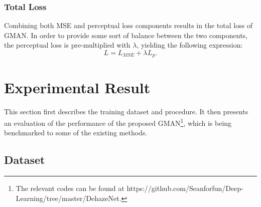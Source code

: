 \documentclass[journal]{IEEEtran}
\begin{document}



\subsubsection{Total Loss}
Combining both MSE and perceptual loss components results in the total loss of GMAN. In order to provide some sort of balance between the two components, the perceptual loss is pre-multiplied with $\lambda$, yielding the following expression:
\begin{equation}\label{loss}
L=L_{MSE}+\lambda_{}L_{p}.
\end{equation}


\section{Experimental Result}

This section first describes the training dataset and procedure. It then presents an evaluation of the performance of the proposed GMAN\footnote{The relevant codes can be found at https://github.com/Seanforfun/Deep-Learning/tree/master/DehazeNet.}, which is being benchmarked to some of the existing methods.

\subsection{Dataset}
\end{document}
